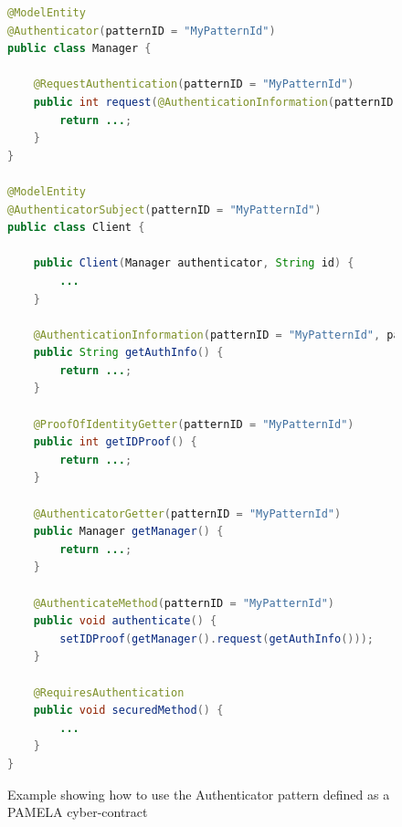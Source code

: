 \begin{figure}
    \centering
\begin{lstlisting}[language=Java,basicstyle=\ttfamily\footnotesize]
@ModelEntity
@Authenticator(patternID = "MyPatternId")
public class Manager {

	@RequestAuthentication(patternID = "MyPatternId")
	public int request(@AuthenticationInformation(patternID = "MyPatternId", paramID = "id") String id) {
		return ...;
	}
}

@ModelEntity
@AuthenticatorSubject(patternID = "MyPatternId")
public class Client {

	public Client(Manager authenticator, String id) {
		...
	}

	@AuthenticationInformation(patternID = "MyPatternId", paramID = "id")
	public String getAuthInfo() {
		return ...;
	}

	@ProofOfIdentityGetter(patternID = "MyPatternId")
	public int getIDProof() {
		return ...;
	}

	@AuthenticatorGetter(patternID = "MyPatternId")
	public Manager getManager() {
		return ...;
	}

	@AuthenticateMethod(patternID = "MyPatternId")
	public void authenticate() {
		setIDProof(getManager().request(getAuthInfo()));
	}

	@RequiresAuthentication
	public void securedMethod() {
		...
	}
}
\end{lstlisting}
    \caption{Example showing how to use the Authenticator pattern defined as a PAMELA cyber-contract}
    \label{fig:ExampleOfAuthenticatorPattern}
\end{figure}


